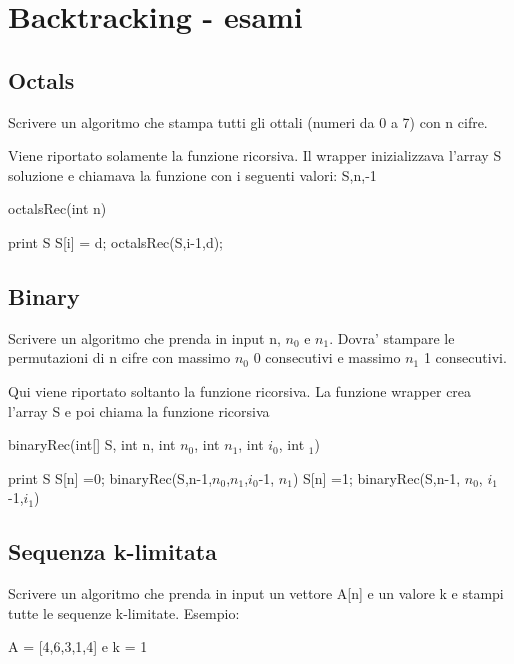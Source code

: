 \documentclass[oneside]{book}
\begin{document}
\chapter{Backtracking - esami}
\section{Octals}
Scrivere un algoritmo che stampa tutti gli ottali (numeri da 0 a 7) con n cifre.

Viene riportato solamente la funzione ricorsiva. Il wrapper inizializzava l'array S soluzione e chiamava la funzione con i seguenti valori: S,n,-1

\begin{algorithm}
\caption{octalsRec(int n)\label{alg:cap}}
\begin{algorithmic}
	\State print S
\Else
			\State S[i] = d;
			\State octalsRec(S,i-1,d);
		\EndIf
	\EndFor
\EndIf

\end{algorithmic}
\end{algorithm}

\newpage
\section{Binary}
Scrivere un algoritmo che prenda in input n, $n_0$ e $n_1$. Dovra' stampare le permutazioni di n cifre con massimo $n_0$ 0 consecutivi e massimo $n_1$ 1 consecutivi. 

Qui viene riportato soltanto la funzione ricorsiva. La funzione wrapper crea l'array S e poi chiama la funzione ricorsiva 
\begin{algorithm}
\caption{binaryRec(int[] S, int n, int $n_0$, int $n_1$, int $i_0$, int $_1$)}
\begin{algorithmic}
	\State print S
\EndIf
{}
	\State S[n] =0;
	\State binaryRec(S,n-1,$n_0$,$n_1$,$i_0$-1, $n_1$)
\EndIf
{}
	\State S[n] =1;
	\State binaryRec(S,n-1, $n_0$, $i_1$-1,$i_1$)
\EndIf	
\end{algorithmic}
\end{algorithm}
\newpage
\section{Sequenza k-limitata}
Scrivere un algoritmo che prenda in input un vettore A[n] e un valore k e stampi tutte le sequenze k-limitate. Esempio: 

A = [4,6,3,1,4] e k = 1
\end{document}
